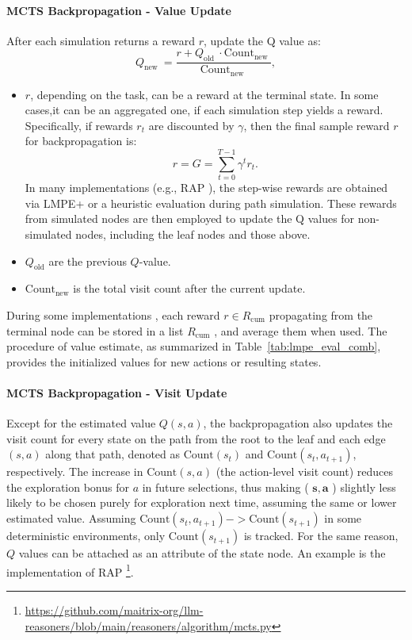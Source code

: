 \paragraph{MCTS Backpropagation - Value Update}
After each simulation returns a reward $r$, update the Q value as:
\begin{equation}
    Q_{\text {new }}=\frac{r+Q_{\text {old }}  \cdot \text{Count}_{\text {new }}}{\text{Count}_{\text {new }}}, 
\end{equation}
\begin{itemize}
    \item $r$, depending on the task, can be a reward at the terminal state. In some cases,it can be an aggregated one, if each simulation step yields a reward. Specifically, if rewards \(r_t\) are discounted by \(\gamma\), then the final sample reward \(r\) for backpropagation is:
    \[
    r = G = \sum_{t=0}^{T-1} \gamma^t r_t.
    \]
    In many implementations (e.g., RAP \citep{hao-etal-2023-reasoning}), the step-wise rewards are obtained via LMPE+ or a heuristic evaluation during path simulation. These rewards from simulated nodes are then employed to update the Q values for non-simulated nodes, including the leaf nodes and those above.
    \item \( Q_{\text{old}} \) are the previous \( Q \)-value.
    \item \( \text{Count}_{\text{new}} \) is the total visit count after the current update.
\end{itemize}
During some implementations \citep{hao-etal-2023-reasoning}, each reward $r \in R_\text{cum}$ propagating from the terminal node can be stored in a list $R_\text{cum}$ , and average them when used.
The procedure of value estimate, as summarized in Table~\ref{tab:lmpe_eval_comb}, provides the initialized values for new actions or resulting states.  

\paragraph{MCTS Backpropagation - Visit Update}
Except for the estimated value $Q(s, a)$, the backpropagation also updates the visit count for every state on the path from the root to the leaf and each edge $(s, a)$ along that path, denoted as $\text{Count}\left(s_t\right)$ and $\text{Count}\left(s_t, a_{t+1}\right)$, respectively.
The increase in $\text{Count}(s, a)$ (the action-level visit count) reduces the exploration bonus for $a$ in future selections, thus making ( $\mathbf{s}, \mathbf{a}$ ) slightly less likely to be chosen purely for exploration next time, assuming the same or lower estimated value.
Assuming $\text{Count}\left(s_t, a_{t+1}\right) -> \text{Count}\left(s_{t+1}\right)$ in some deterministic environments, only $\text{Count}\left(s_{t+1}\right)$ is tracked. 
For the same reason, $Q$ values can be attached as an attribute of the state node.
An example is the implementation of RAP \citep{hao-etal-2023-reasoning} \footnote{\url{https://github.com/maitrix-org/llm-reasoners/blob/main/reasoners/algorithm/mcts.py}}.
